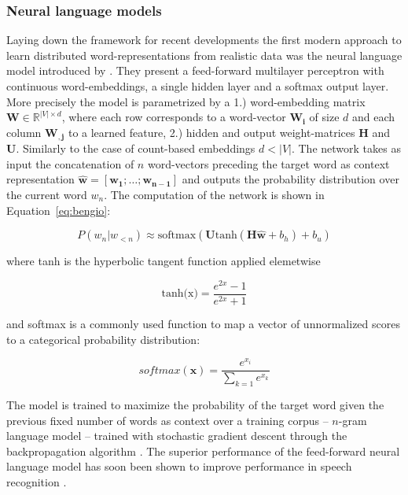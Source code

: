 \subsubsection{Neural language models}
\label{sec:NNLM}
Laying down the framework for recent developments the first modern approach to learn 
distributed word-representations from realistic data
was the neural language model introduced by \cite{bengio2003neural}.
They present a feed-forward multilayer perceptron with continuous word-embeddings,
a single hidden layer and a softmax output layer.
More precisely the model is parametrized by a 1.) word-embedding matrix
$\mathbf{W} \in \mathbb{R}^{|V| \times d}$, where each row corresponds to a word-vector
$\mathbf{W_i}$ of size $d$ and each column $\mathbf{W_{,j}}$ to a learned feature, 2.)
hidden and output weight-matrices $\mathbf{H}$ and $\mathbf{U}$. Similarly
to the case of count-based embeddings $d < |V|$.
The network takes as input the concatenation of $n$ word-vectors preceding the target word as context
representation $\hat{\mathbf{w}} = [\mathbf{w_1}; \ldots; \mathbf{w_{n-1}}]$
and outputs the probability distribution over the current word $w_n$.
The computation of the network is shown in Equation~\ref{eq:bengio}:

\begin{equation}
\label{eq:bengio}
P(w_n|w_{<n}) \approx \text{softmax}(\mathbf{U} \text{tanh}(\mathbf{H} \mathbf{\hat{w}} + b_h ) + b_u)
\end{equation}

where tanh is the hyperbolic tangent function applied elemetwise

\begin{equation}
\label{eq:tanh}
\text{tanh(x)} = \frac{e^{2x} - 1 }{e^{2x} + 1 }
\end{equation}

and softmax is a commonly used function to map a vector of unnormalized scores to a
categorical probability distribution:

\begin{equation}
softmax(\mathbf{x}) = \frac{e^{x_{i}}}{\sum_{k=1} e^{x_k}}
\end{equation}

The model is trained to maximize the probability of
the target word given the previous fixed number of words as context over a training corpus
-- $n$-gram language model -- trained with stochastic gradient descent \citep{cauchy1847methode}
through the backpropagation algorithm \citep{rumelhart1985learning}.
The superior performance of the feed-forward neural language model has soon been shown to
improve performance in speech recognition \citep{schwenk2005training}.

